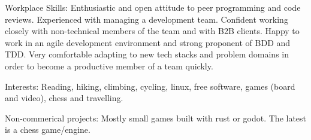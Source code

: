 
\inlineheadsection 
{Workplace Skills:} {Enthusiastic and open attitude to peer programming and code reviews. Experienced with managing a development team. Confident working closely with non-technical members of the team and with B2B clients. Happy to work in an agile development environment and strong proponent of BDD and TDD. Very comfortable adapting to new tech stacks and problem domains in order to become a productive member of a team quickly.}

\inlineheadsection 
{Interests:} {Reading, hiking, climbing, cycling, linux, free software, games (board and video), chess and travelling.}

\inlineheadsection 
{Non-commerical projects:} {Mostly small games built with rust or godot. The latest is a chess game/engine.}